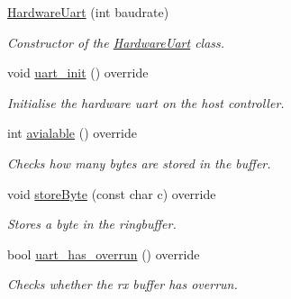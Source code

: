 \begin{DoxyCompactItemize}
\item 
\hyperlink{classhwuart_1_1HardwareUart_acb12d8b48f3b93a02bc8c8d2798628c0}{Hardware\+Uart} (int baudrate)
\begin{DoxyCompactList}\small\item\em Constructor of the \hyperlink{classhwuart_1_1HardwareUart}{Hardware\+Uart} class. \end{DoxyCompactList}\item 
\mbox{\label{classhwuart_1_1HardwareUart_ad157ae997485682f74c5607dc7d2dc70}} 
void \hyperlink{classhwuart_1_1HardwareUart_ad157ae997485682f74c5607dc7d2dc70}{uart\+\_\+init} () override
\begin{DoxyCompactList}\small\item\em Initialise the hardware uart on the host controller. \end{DoxyCompactList}\item 
\mbox{\label{classhwuart_1_1HardwareUart_a33e37be3c5ca23f535a5ac0d5bc359ff}} 
int \hyperlink{classhwuart_1_1HardwareUart_a33e37be3c5ca23f535a5ac0d5bc359ff}{avialable} () override
\begin{DoxyCompactList}\small\item\em Checks how many bytes are stored in the buffer. \end{DoxyCompactList}\item 
\mbox{\label{classhwuart_1_1HardwareUart_a8cfad9b051ec4da22304d59695ac09cc}} 
void \hyperlink{classhwuart_1_1HardwareUart_a8cfad9b051ec4da22304d59695ac09cc}{store\+Byte} (const char c) override
\begin{DoxyCompactList}\small\item\em Stores a byte in the ringbuffer. \end{DoxyCompactList}\item 
bool \hyperlink{classhwuart_1_1HardwareUart_a718748c857525adb450fff2b37b3506c}{uart\+\_\+has\+\_\+overrun} () override
\begin{DoxyCompactList}\small\item\em Checks whether the rx buffer has overrun. \end{DoxyCompactList}\item 
\mbox{\label{classhwuart_1_1HardwareUart_a2a7cc19a29ac50b51a400df07d015490}} 

\end{DoxyCompactItemize}
